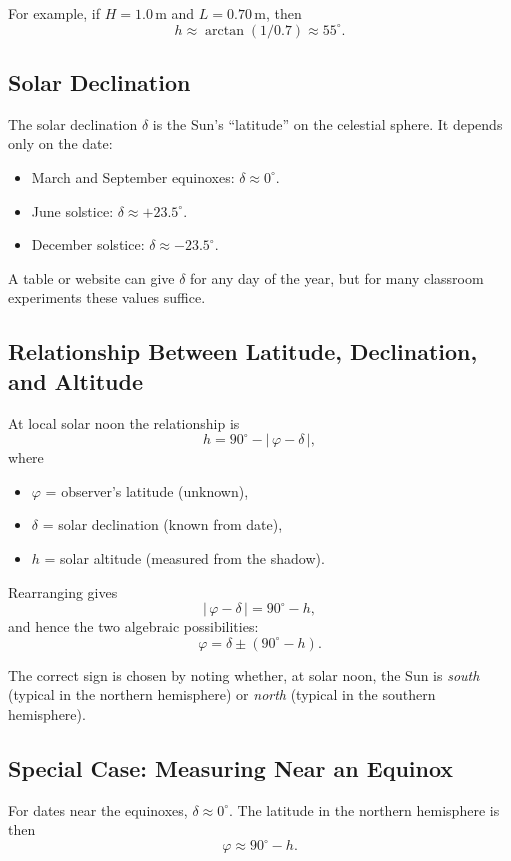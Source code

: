 \documentclass[11pt]{article}
\begin{document}
For example, if $H=1.0\,$m and $L=0.70\,$m, then
\[
h \approx \arctan(1/0.7) \approx 55^\circ.
\]

\subsection*{Solar Declination}

The solar declination $\delta$ is the Sun's ``latitude'' on the celestial
sphere. It depends only on the date:
\begin{itemize}
    \item March and September equinoxes: $\delta \approx 0^\circ$.
    \item June solstice: $\delta \approx +23.5^\circ$.
    \item December solstice: $\delta \approx -23.5^\circ$.
\end{itemize}
A table or website can give $\delta$ for any day of the year, but for many
classroom experiments these values suffice.

\subsection*{Relationship Between Latitude, Declination, and Altitude}

At local solar noon the relationship is
\[
h = 90^\circ - \lvert\,\varphi - \delta\,\rvert,
\]
where
\begin{itemize}
    \item $\varphi$ = observer's latitude (unknown),
    \item $\delta$ = solar declination (known from date),
    \item $h$ = solar altitude (measured from the shadow).
\end{itemize}

Rearranging gives
\[
\lvert\,\varphi - \delta\,\rvert = 90^\circ - h,
\]
and hence the two algebraic possibilities:
\[
\varphi = \delta \pm (90^\circ - h).
\]

The correct sign is chosen by noting whether, at solar noon, the Sun is
\emph{south} (typical in the northern hemisphere) or \emph{north}
(typical in the southern hemisphere).

\subsection*{Special Case: Measuring Near an Equinox}

For dates near the equinoxes, $\delta \approx 0^\circ$. The latitude in the
northern hemisphere is then
\[
\varphi \approx 90^\circ - h.
\]
\end{document}
